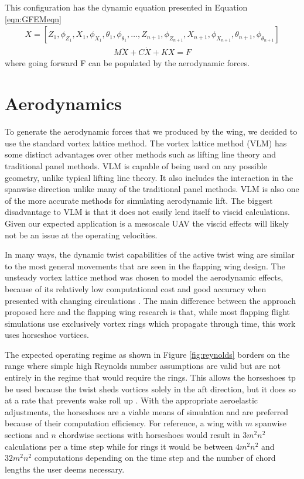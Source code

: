 \documentclass[11pt]{ucthesis}
\begin{document}
This configuration has the dynamic equation presented in Equation \ref{eqn:GFEMeqn}
\begin{eqnarray}
X = [Z_1,\phi_{Z_1}, X_1,\phi_{X_1},\theta_1,\phi_{\theta_1}, \ldots,Z_{n+1},\phi_{Z_{n+1}}, X_{n+1},\phi_{X_{n+1}},\theta_{n+1},\phi_{\theta_{n+1}}]
\end{eqnarray}
\begin{eqnarray}
M\ddot{X}+C\dot{X}+KX = F
\label{eqn:GFEMeqn}
\end{eqnarray}
where going forward F can be populated by the aerodynamic forces.

\section{Aerodynamics}
\label{sec:aeroModel}
To generate the aerodynamic forces that we produced by the wing, we decided to use the standard vortex lattice method. The vortex lattice method (VLM) has some distinct advantages over other methods such as lifting line theory and traditional panel methods. VLM is capable of being used on any possible geometry, unlike typical lifting line theory. It also includes the interaction in the spanwise direction unlike many of the traditional panel methods. VLM is also one of the more accurate methods for simulating aerodynamic lift. \cite{bertin1998aerodynamics} The biggest disadvantage to VLM is that it does not easily lend itself to viscid calculations. Given our expected application is a mesoscale UAV the viscid effects will likely not be an issue at the operating velocities.

In many ways, the dynamic twist capabilities of the active twist wing are similar to the most general movements that are seen in the flapping wing design. The unsteady vortex lattice method was chosen to model the aerodynamic effects, because of its relatively low computational cost and good accuracy when presented with changing circulations \cite{long2004object,stanford2010analytical,de2012object}. The main difference between the approach proposed here and the flapping wing research is that, while most flapping flight simulations use exclusively vortex rings which propagate through time, this work uses horseshoe vortices. 

The expected operating regime as shown in Figure \ref{fig:reynolds} borders on the range where simple high Reynolds number assumptions are valid but are not entirely in the regime that would require the rings. This allows the horseshoes tp be used because the twist sheds vortices solely in the aft direction, but it does so at a rate that prevents wake roll up \cite{koochesfahani1989vortical}. With the appropriate aeroelastic adjustments, the horseshoes are a viable means of simulation and are preferred because of their computation efficiency. For reference, a wing with $m$ spanwise sections and $n$ chordwise sections with horseshoes would result in $3m^2n^2$ calculations per a time step while for rings it would be between $4m^2n^2$ and $32m^2n^2$ computations depending on the time step and the number of chord lengths the user deems necessary. 
\end{document}
